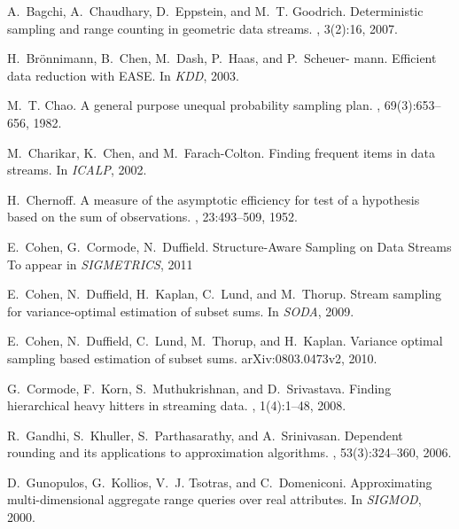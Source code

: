 \documentclass[11pt]{article}
\begin{document}
{\begin{thebibliography}{10}
\addtolength{\itemsep}{-0.33mm}
A.~Bagchi, A.~Chaudhary, D.~Eppstein, and M.~T. Goodrich.
\newblock Deterministic sampling and range counting in geometric data streams.
, 3(2):16, 2007.

H.~Br\"{o}nnimann, B.~Chen, M.~Dash, P.~Haas, and P.~Scheuer- mann.
\newblock Efficient data reduction with {EASE}.
\newblock In {\em KDD}, 2003.

M.~T. Chao.
\newblock A general purpose unequal probability sampling plan.
, 69(3):653--656, 1982.

M.~Charikar, K.~Chen, and M.~Farach-Colton.
\newblock Finding frequent items in data streams.
\newblock In {\em  ICALP}, 2002.

H.~Chernoff.
\newblock A measure of the asymptotic efficiency for test of a hypothesis based
  on the sum of observations.
, 23:493--509, 1952.

E.~Cohen, G.~Cormode, N.~Duffield. 
\newblock Structure-Aware Sampling on Data Streams
\newblock To appear in {\em SIGMETRICS}, 2011

E.~Cohen, N.~Duffield, H.~Kaplan, C.~Lund, and M.~Thorup.
\newblock Stream sampling for variance-optimal estimation of subset sums.
\newblock In {\em SODA}, 2009.

E.~Cohen, N.~Duffield, C.~Lund, M.~Thorup, and H.~Kaplan.
\newblock Variance optimal sampling based estimation of subset sums.
\newblock arXiv:0803.0473v2, 2010.

G.~Cormode, F.~Korn, S.~Muthukrishnan, and D.~Srivastava.
\newblock Finding hierarchical heavy hitters in streaming data.
, 1(4):1--48, 2008.

R.~Gandhi, S.~Khuller, S.~Parthasarathy, and A.~Srinivasan.
\newblock Dependent rounding and its applications to approximation algorithms.
, 53(3):324--360, 2006.

D.~Gunopulos, G.~Kollios, V.~J. Tsotras, and C.~Domeniconi.
\newblock Approximating multi-dimensional aggregate range queries over real
  attributes.
\newblock In {\em SIGMOD}, 2000.


\end{thebibliography}}
\end{document}
